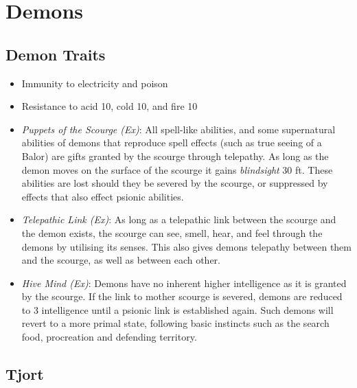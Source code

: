\section{Demons}
\label{sec:monsters:Demons}

\subsection{Demon Traits}
\label{sec:Demon Traits}

\begin{itemize}[noitemsep]
  \item Immunity to electricity and poison
  \item Resistance to acid 10, cold 10, and fire 10
  \item \emph{Puppets of the Scourge (Ex)}: All spell-like abilities, and some
    supernatural abilities of demons that reproduce spell effects (such as
    true seeing of a Balor) are gifts granted by the scourge through
    telepathy.  As long as the demon moves on the surface of the scourge it
    gains \emph{blindsight} 30 ft. These abilities are lost should they be
    severed by the scourge, or suppressed by effects that also effect psionic
    abilities.
  \item \emph{Telepathic Link (Ex)}: As long as a telepathic link between the
    scourge and the demon exists, the scourge can see, smell, hear, and feel
    through the demons by utilising its senses. This also gives demons telepathy
    between them and the scourge, as well as between each other.
  \item \emph{Hive Mind (Ex)}: Demons have no inherent higher intelligence as it
    is granted by the scourge. If the link to mother scourge is severed,
    demons are reduced to 3 intelligence until a psionic link is established
    again. Such demons will revert to a more primal state, following basic
    instincts such as the search food, procreation and defending territory.
\end{itemize}

\subsection{Tjort}
\label{sec:monsters:Tjort}

